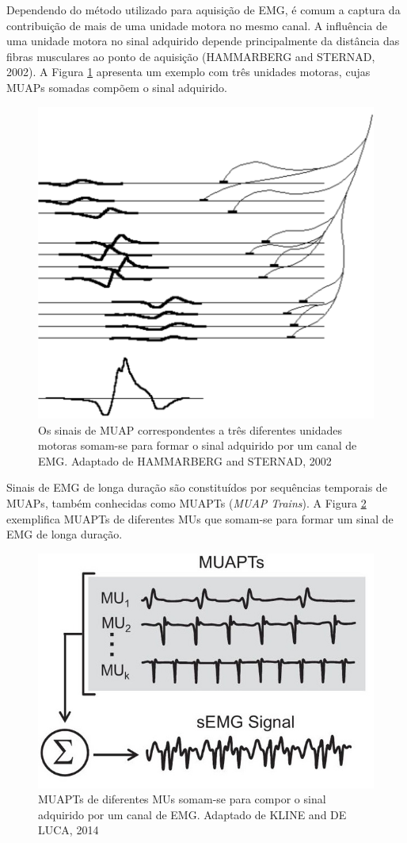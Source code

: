 \documentclass[
	12pt,				%
	openright,			%
	oneside,
	a4paper,			%
	english,			%
	francais,			%
	spanish,			%
	brazil				%
	]{abntex2}
\begin{document}
	Dependendo do método utilizado para aquisição de EMG, é comum a captura da contribuição de mais de uma unidade motora no mesmo canal. A influência de uma unidade motora no sinal adquirido depende principalmente da distância das fibras musculares ao ponto de aquisição (HAMMARBERG and STERNAD, 2002). A Figura \ref{fig:MUAP_soma} apresenta um exemplo com três unidades motoras, cujas MUAPs somadas compõem o sinal adquirido.
	
\begin{figure}
\centering
\includegraphics[width=0.6\linewidth]{../img/MUAP_soma.PNG}
\caption{Os sinais de MUAP correspondentes a três diferentes unidades motoras somam-se para formar o sinal adquirido por um canal de EMG. Adaptado de HAMMARBERG and STERNAD, 2002}
\label{fig:MUAP_soma}
\end{figure}
	
	Sinais de EMG de longa duração são constituídos por sequências temporais de MUAPs, também conhecidas como MUAPTs (\emph{MUAP Trains}). A Figura \ref{fig:MUAP_trains} exemplifica MUAPTs de diferentes MUs que somam-se para formar um sinal de EMG de longa duração.
	
\begin{figure}
\centering
\includegraphics[width=0.6\linewidth]{../img/MUAP_trains.jpg}
\caption{MUAPTs de diferentes MUs somam-se para compor o sinal adquirido por um canal de EMG. Adaptado de KLINE and DE LUCA, 2014}
\label{fig:MUAP_trains}
\end{figure}
\end{document}
